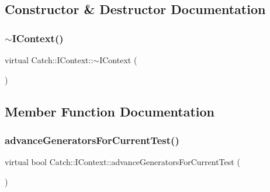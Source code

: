 \subsection{Constructor \& Destructor Documentation}
\hypertarget{struct_catch_1_1_i_context_aeb17355c1be6c2ced5407cad7202628d}{}\label{struct_catch_1_1_i_context_aeb17355c1be6c2ced5407cad7202628d} 
\subsubsection{\texorpdfstring{$\sim$\+I\+Context()}{~IContext()}}
{\footnotesize\ttfamily virtual Catch\+::\+I\+Context\+::$\sim$\+I\+Context (\begin{DoxyParamCaption}{ }\end{DoxyParamCaption})\hspace{0.3cm}{\ttfamily [virtual]}}



\subsection{Member Function Documentation}
\hypertarget{struct_catch_1_1_i_context_a806f7c4ed24d51adae90418e661b24b7}{}\label{struct_catch_1_1_i_context_a806f7c4ed24d51adae90418e661b24b7} 
\subsubsection{\texorpdfstring{advance\+Generators\+For\+Current\+Test()}{advanceGeneratorsForCurrentTest()}}
{\footnotesize\ttfamily virtual bool Catch\+::\+I\+Context\+::advance\+Generators\+For\+Current\+Test (\begin{DoxyParamCaption}{ }\end{DoxyParamCaption})\hspace{0.3cm}{\ttfamily [pure virtual]}}

\hypertarget{struct_catch_1_1_i_context_aee81c415899262e096ad8d6f686fa365}{}\label{struct_catch_1_1_i_context_aee81c415899262e096ad8d6f686fa365} 
